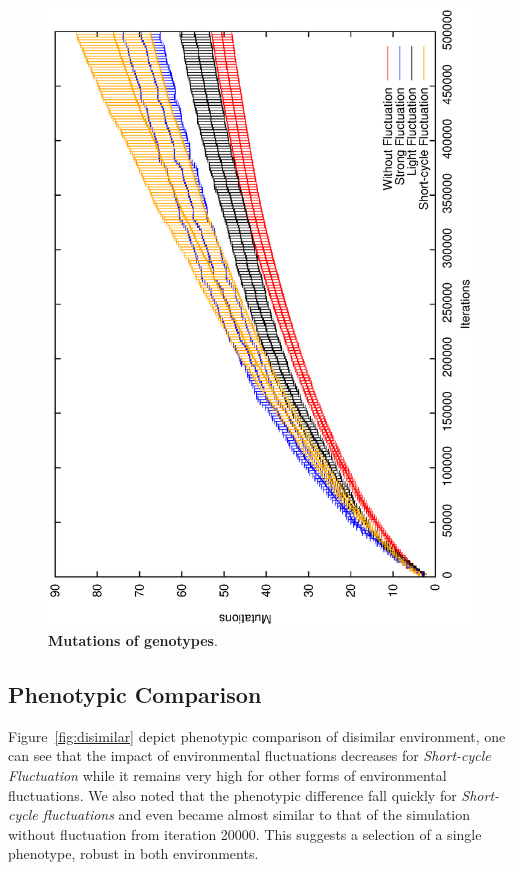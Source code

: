 \begin{figure}[h]
\centering
\includegraphics[width=0.7\columnwidth, angle =-90 ]{img/Mutations}
\caption{\textbf{Mutations of genotypes}.
}
\label{fig:Mutations}
\end{figure}

\subsection{Phenotypic Comparison}
Figure~\ref{fig:disimilar} depict phenotypic comparison of disimilar environment, one can see that the impact of environmental fluctuations decreases for \emph{Short-cycle  Fluctuation} while it remains very high for other forms of environmental fluctuations. We also noted that the phenotypic difference fall quickly for \emph{Short-cycle fluctuations} and even became almost similar to that of the simulation without fluctuation from iteration 20000. This suggests a selection of a single phenotype, robust in both environments. 

